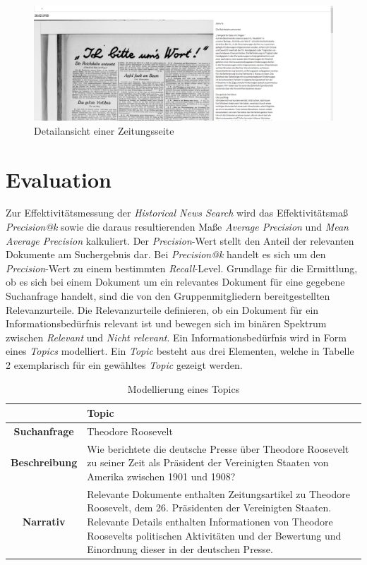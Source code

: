 \documentclass[11pt,a4paper, halfparskip]{scrartcl}
\begin{document}
\begin{figure}[h]
	\includegraphics[width=\linewidth]{images/details-view.png}
	\caption{Detailansicht einer Zeitungsseite}
\end{figure}

\section{Evaluation}

Zur Effektivitätsmessung der \textit{Historical News Search} wird das Effektivitätsmaß \textit{Precision@k} sowie die daraus resultierenden Maße \textit{Average Precision} und \textit{Mean Average Precision} kalkuliert.
Der \textit{Precision}-Wert stellt den Anteil der relevanten Dokumente am Suchergebnis dar. 
Bei \textit{Precision@k} handelt es sich um den \textit{Precision}-Wert zu einem bestimmten \textit{Recall}-Level.
Grundlage für die Ermittlung, ob es sich bei einem Dokument um ein relevantes Dokument für eine gegebene Suchanfrage handelt, sind die von den Gruppenmitgliedern bereitgestellten Relevanzurteile.
Die Relevanzurteile definieren, ob ein Dokument für ein Informationsbedürfnis relevant ist und bewegen sich im binären Spektrum zwischen \textit{Relevant} und \textit{Nicht relevant}.
Ein Informationsbedürfnis wird in Form eines \textit{Topics} modelliert.
Ein \textit{Topic} besteht aus drei Elementen, welche in Tabelle 2 exemplarisch für ein gewähltes \textit{Topic} gezeigt werden. 

\begin{table}[h]
	\centering
	\begin{tabularx}{\textwidth}{|c|p{9.55cm}|}
		\hline 
		& \textbf{Topic} \\ 
		\hline 
		\textbf{Suchanfrage} & Theodore Roosevelt \\ 
		\hline 
		\textbf{Beschreibung} & Wie berichtete die deutsche Presse über Theodore Roosevelt zu seiner Zeit als Präsident der Vereinigten Staaten von Amerika zwischen 1901 und 1908? \\ 
		\hline 
		\textbf{Narrativ} & Relevante Dokumente enthalten Zeitungsartikel zu Theodore Roosevelt, dem 26. Präsidenten der Vereinigten Staaten. Relevante Details enthalten Informationen von Theodore Roosevelts politischen Aktivitäten und der Bewertung und Einordnung dieser in der deutschen Presse. \\ 
		\hline 
	\end{tabularx}
\caption{Modellierung eines Topics}
\end{table}
\end{document}
